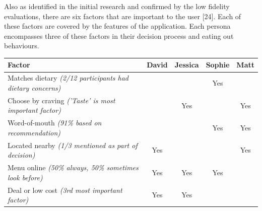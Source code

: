 \documentclass[a4 paper, 12pt]{article}
\begin{document}
    Also as identified in the initial research and confirmed by the low fidelity evaluations, there are six factors that are important to the user [24]. Each of these factors are covered by the features of the application. Each persona encompasses three of these factors in their decision process and eating out behaviours.
    \begin{center}
    \begin{tabular}{|l|c|c|c|c|}   
        \hline  
        Factor                                                          & David & Jessica& Sophie   & Matt \\
        \hline \hline
        Matches dietary \textit{(2/12 participants had dietary concerns)}&      &       & Yes       &   \\
        \hline
        Choose by craving \textit{('Taste' is most important factor)}   &       & Yes   &           & Yes \\ 
        \hline
        Word-of-mouth \textit{(91\% based on recommendation)}           &       &       & Yes       & Yes \\ 
        \hline
        Located nearby \textit{(1/3 mentioned as part of decision)}     & Yes   &       &           & Yes \\ 
        \hline
        Menu online \textit{(50\% always, 50\% sometimes look before)}  & Yes   & Yes   & Yes       &  \\
        \hline
        Deal or low cost \textit{(3rd most important factor)}           & Yes   & Yes   &           &  \\
        \hline
        \end{tabular}
    \end{center}
    
 
\end{document}
